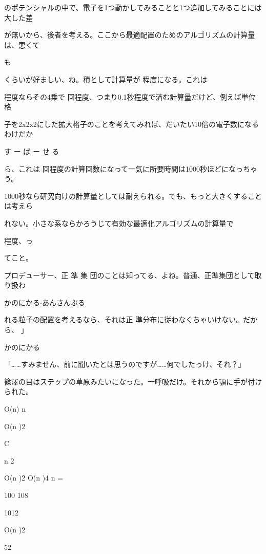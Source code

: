 のポテンシャルの中で、電⼦を1つ動かしてみることと1つ追加してみることには⼤した差\par
が無いから、後者を考える。ここから最適配置のためのアルゴリズムの計算量は、悪くて\par
も\par
くらいが好ましい、ね。積として計算量が  程度になる。これは\par
程度ならその4乗で  回程度、つまり0.1秒程度で済む計算量だけど、例えば単位格\par
⼦を2x2x2にした拡⼤格⼦のことを考えてみれば、だいたい10倍の電⼦数になるわけだか\par
す ー ぱ ー せ る\par
ら、これは  回程度の計算回数になって⼀気に所要時間は1000秒ほどになっちゃう。\par
1000秒なら研究向けの計算量としては耐えられる。でも、もっと⼤きくすることは考えら\par
れない。⼩さな系ならかろうじて有効な最適化アルゴリズムの計算量で\par
程度、っ\par
てこと。\par
プロデューサー、正 準 集 団のことは知ってる、よね。普通、正準集団として取り扱わ\par
かのにかる$\cdot$あんさんぶる\par
れる粒⼦の配置を考えるなら、それは正 準分布に従わなくちゃいけない。だから、 」\par
かのにかる\par
「……すみません、前に聞いたとは思うのですが……何でしたっけ、それ？」\par
篠澤の⽬はステップの草原みたいになった。⼀呼吸だけ。それから顎に⼿が付けられた。\par
O(n) n\par
O(n )2\par
C\par
n 2\par
O(n )2 O(n )4 n =\par
100 108\par
1012\par
O(n )2\par
52\par

